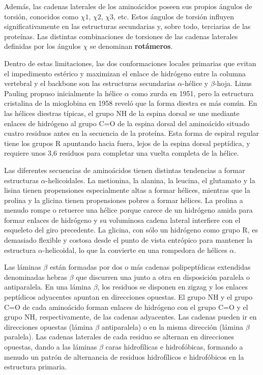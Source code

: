 Además, las cadenas laterales de los aminoácidos poseen sus propios ángulos de torsión, conocidos como $\chi1$, $\chi2$, $\chi3$, etc. Estos ángulos de torsión influyen significativamente en las estructuras secundarias y, sobre todo, terciarias de las proteínas. Las distintas combinaciones de torsiones de las cadenas laterales definidas por los ángulos $\chi$ se denominan \textbf{rotámeros}.

Dentro de estas limitaciones, las dos conformaciones locales primarias que evitan el impedimento estérico y maximizan el enlace de hidrógeno entre la columna vertebral y el backbone son las estructuras secundarias $\alpha$-hélice y $\beta$-hoja. Linus Pauling propuso inicialmente la hélice $\alpha$ como zurda en 1951, pero la estructura cristalina de la mioglobina en 1958 reveló que la forma diestra es más común. En las hélices diestras típicas, el grupo NH de la espina dorsal se une mediante enlaces de hidrógeno al grupo C=O de la espina dorsal del aminoácido situado cuatro residuos antes en la secuencia de la proteína. Esta forma de espiral regular tiene los grupos R apuntando hacia fuera, lejos de la espina dorsal peptídica, y requiere unos 3,6 residuos para completar una vuelta completa de la hélice.

Las diferentes secuencias de aminoácidos tienen distintas tendencias a formar estructuras $\alpha$-helicoidales. La metionina, la alanina, la leucina, el glutamato y la lisina tienen propensiones especialmente altas a formar hélices, mientras que la prolina y la glicina tienen propensiones pobres a formar hélices. La prolina a menudo rompe o retuerce una hélice porque carece de un hidrógeno amida para formar enlaces de hidrógeno y su voluminosa cadena lateral interfiere con el esqueleto del giro precedente. La glicina, con sólo un hidrógeno como grupo R, es demasiado flexible y costosa desde el punto de vista entrópico para mantener la estructura $\alpha$-helicoidal, lo que la convierte en una rompedora de hélices $\alpha$.

Las láminas $\beta$ están formadas por dos o más cadenas polipeptídicas extendidas denominadas hebras $\beta$ que discurren una junto a otra en disposición paralela o antiparalela. En una lámina $\beta$, los residuos se disponen en zigzag y los enlaces peptídicos adyacentes apuntan en direcciones opuestas. El grupo NH y el grupo C=O de cada aminoácido forman enlaces de hidrógeno con el grupo C=O y el grupo NH, respectivamente, de las cadenas adyacentes. Las cadenas pueden ir en direcciones opuestas (lámina $\beta$ antiparalela) o en la misma dirección (lámina $\beta$ paralela). Las cadenas laterales de cada residuo se alternan en direcciones opuestas, dando a las láminas $\beta$ caras hidrofílicas e hidrofóbicas, formando a menudo un patrón de alternancia de residuos hidrofílicos e hidrofóbicos en la estructura primaria.

